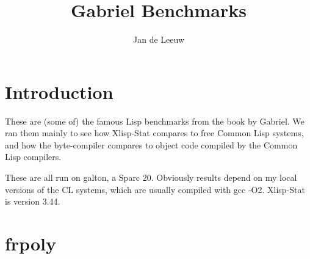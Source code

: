 \documentclass{amsart}
\begin{document}
\title{Gabriel Benchmarks}
\author{Jan de Leeuw}
\maketitle
\section{Introduction}
These are (some of) the famous Lisp benchmarks from
the book by Gabriel. We ran them mainly to see how
Xlisp-Stat compares to free Common Lisp systems, and
how the byte-compiler compares to object code compiled
by the Common Lisp compilers.

These are all run on galton, a Sparc 20. Obviously
results depend on my local versions of the CL systems,
which are usually compiled with gcc -O2. Xlisp-Stat
is version 3.44.
\section{frpoly}
\end{document}

